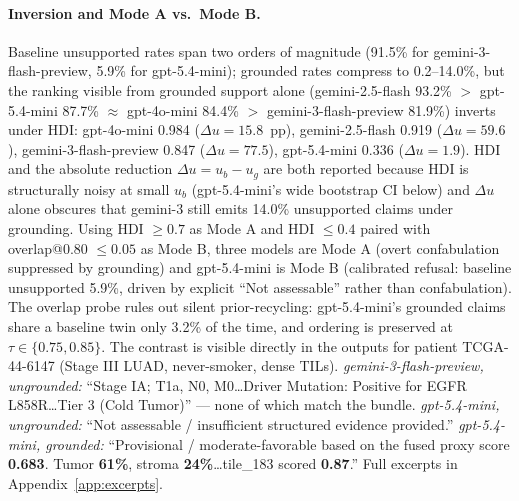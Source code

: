 \documentclass{article}
\theoremstyle{plain}
\begin{document}
\paragraph{Inversion and Mode A vs.\ Mode B.}
Baseline unsupported rates span two orders of magnitude (91.5\% for gemini-3-flash-preview, 5.9\% for gpt-5.4-mini); grounded rates compress to 0.2--14.0\%, but the ranking visible from grounded support alone (gemini-2.5-flash 93.2\% $>$ gpt-5.4-mini 87.7\% $\approx$ gpt-4o-mini 84.4\% $>$ gemini-3-flash-preview 81.9\%) inverts under HDI: gpt-4o-mini 0.984 ($\Delta u{=}15.8$~pp), gemini-2.5-flash 0.919 ($\Delta u{=}59.6$), gemini-3-flash-preview 0.847 ($\Delta u{=}77.5$), gpt-5.4-mini 0.336 ($\Delta u{=}1.9$). HDI and the absolute reduction $\Delta u {=} u_b {-} u_g$ are both reported because HDI is structurally noisy at small $u_b$ (gpt-5.4-mini's wide bootstrap CI below) and $\Delta u$ alone obscures that gemini-3 still emits 14.0\% unsupported claims under grounding. Using HDI $\geq 0.7$ as Mode A and HDI $\leq 0.4$ paired with overlap@0.80 $\leq 0.05$ as Mode B, three models are Mode A (overt confabulation suppressed by grounding) and gpt-5.4-mini is Mode B (calibrated refusal: baseline unsupported 5.9\%, driven by explicit ``Not assessable'' rather than confabulation). The overlap probe rules out silent prior-recycling: gpt-5.4-mini's grounded claims share a baseline twin only 3.2\% of the time, and ordering is preserved at $\tau \in \{0.75, 0.85\}$. The contrast is visible directly in the outputs for patient TCGA-44-6147 (Stage III LUAD, never-smoker, dense TILs). \emph{gemini-3-flash-preview, ungrounded:} ``Stage IA; T1a, N0, M0\ldots Driver Mutation: Positive for EGFR L858R\ldots Tier 3 (Cold Tumor)'' --- none of which match the bundle. \emph{gpt-5.4-mini, ungrounded:} ``Not assessable / insufficient structured evidence provided.'' \emph{gpt-5.4-mini, grounded:} ``Provisional / moderate-favorable based on the fused proxy score \textbf{0.683}. Tumor \textbf{61\%}, stroma \textbf{24\%}\ldots tile\_183 scored \textbf{0.87}.'' Full excerpts in Appendix~\ref{app:excerpts}.
\end{document}
